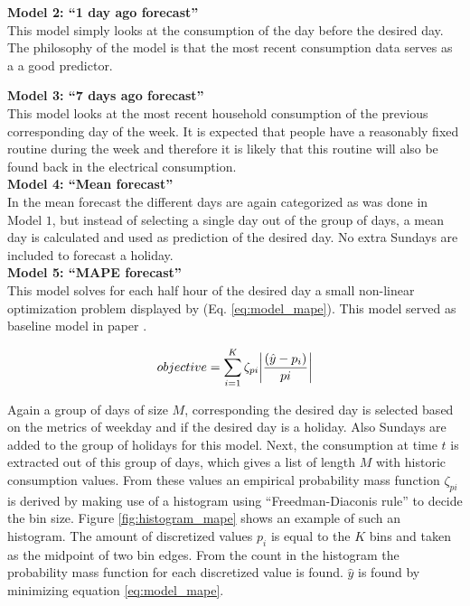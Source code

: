 \textbf{Model 2: ``1 day ago forecast''}\\
 This model simply looks at the consumption of the day before the desired day. The philosophy of the model is that the most recent consumption data serves as a a good predictor.
 
 \textbf{Model 3: ``7 days ago forecast''}\\
 This model looks at the most recent household consumption of the previous corresponding day of the week. It is expected that people have a reasonably fixed routine during the week and therefore it is likely that this routine will also be found back in the electrical consumption.\\
 
 \textbf{Model 4: ``Mean forecast''}\\
 In the mean forecast the different days are again categorized as was done in Model $ 1 $, but instead of selecting a single day out of the group of days, a mean day is calculated and used as prediction of the desired day. No extra Sundays are included to forecast a holiday.\\
 
 \textbf{Model 5: ``MAPE forecast'' }\\
 This model solves for each half hour of the desired day a small non-linear optimization problem displayed by (Eq. \ref{eq:model_mape}). This model served as baseline model in paper \cite{Kong2019}. 
 
 \begin{equation}\label{eq:model_mape}
 	objective = \sum_{i=1}^K \zeta_{pi}\abs{\frac{(\hat{y}-p_i)}{pi}}
 \end{equation}
 
 Again a group of days of size $ M $, corresponding the desired day is selected based on the metrics of weekday and if the desired day is a holiday. Also Sundays are added to the group of holidays for this model. Next, the consumption at time $ t $ is extracted out of this group of days, which gives a list of length $ M $ with historic consumption values. From these values an empirical probability mass function $ \zeta_{pi} $ is derived by making use of a histogram using ``Freedman-Diaconis rule'' to decide the bin size. Figure \ref{fig:histogram_mape} shows an example of such an histogram. The amount of discretized values $ p_i $ is equal to the $ K $ bins and taken as the midpoint of two bin edges. From the count in the histogram the probability mass function for each discretized value is found. $ \hat{y} $ is found by minimizing equation \ref{eq:model_mape}.\\
 
